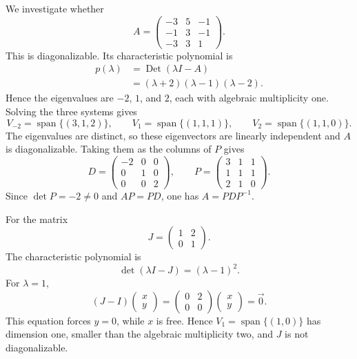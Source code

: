 \begin{example}
We investigate whether
\[
A = \begin{pmatrix} -3 & 5 & -1 \\ -1 & 3 & -1 \\ -3 & 3 & 1
\end{pmatrix}.
\]
This is diagonalizable. Its characteristic polynomial is
\[
\begin{aligned}
p(\lambda)&=\operatorname{Det}(\lambda I-A)\\
&=(\lambda+2)(\lambda-1)(\lambda-2).
\end{aligned}
\]
Hence the eigenvalues are $-2$, $1$, and $2$, each with algebraic
multiplicity one. Solving the three systems gives
\[
V_{-2}=\operatorname{span}\{(3,1,2)\},\qquad
V_1=\operatorname{span}\{(1,1,1)\},\qquad
V_2=\operatorname{span}\{(1,1,0)\}.
\]
The eigenvalues are distinct, so these eigenvectors are linearly
independent and $A$ is diagonalizable. Taking them as the columns of
$P$ gives
\[
D=\begin{pmatrix}-2&0&0\\0&1&0\\0&0&2\end{pmatrix},
\qquad
P=\begin{pmatrix}3&1&1\\1&1&1\\2&1&0\end{pmatrix}.
\]
Since $\det P=-2\neq0$ and $AP=PD$, one has $A=PDP^{-1}$.

\end{example}

For the matrix
\[
J=\begin{pmatrix} 1 & 2 \\ 0 & 1 \end{pmatrix}.
\]
The characteristic polynomial is
\[
\det(\lambda I-J)=(\lambda-1)^2.
\]
For $\lambda=1$,
\[
(J-I)\begin{pmatrix}x\\y\end{pmatrix}
=\begin{pmatrix}0&2\\0&0\end{pmatrix}
\begin{pmatrix}x\\y\end{pmatrix}=\vec0.
\]
This equation forces $y=0$, while $x$ is free. Hence
$V_1=\operatorname{span}\{(1,0)\}$ has dimension one, smaller than the
algebraic multiplicity two, and $J$ is not diagonalizable.

